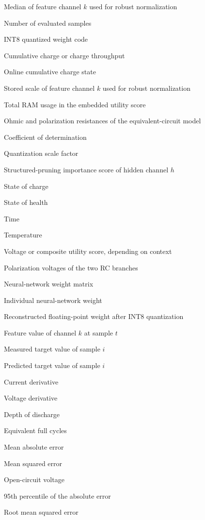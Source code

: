 \documentclass[
    a4paper,
    12pt,
    titlepage,
    bibliography=totoc,
    twoside=on,
    parskip=false,
    numbers=noenddot,
    cleardoublepage=empty,
    DIV=12,
    BCOR=12.0mm,
    headheight=36pt,
    headings=openright
]{scrreprt}
\begin{document}
\begin{description}[style=nextline,leftmargin=3.2cm]
\item[$m_k$] Median of feature channel $k$ used for robust normalization
\item[$n$] Number of evaluated samples
\item[$q$] INT8 quantized weight code
\item[$Q$] Cumulative charge or charge throughput
\item[$Q_c$] Online cumulative charge state
\item[$s_k$] Stored scale of feature channel $k$ used for robust normalization
\item[$R$] Total RAM usage in the embedded utility score
\item[$R_0,R_1,R_2$] Ohmic and polarization resistances of the equivalent-circuit model
\item[$R^2$] Coefficient of determination
\item[$s$] Quantization scale factor
\item[$s_h$] Structured-pruning importance score of hidden channel $h$
\item[$SOC$] State of charge
\item[$SOH$] State of health
\item[$t$] Time
\item[$T$] Temperature
\item[$U$] Voltage or composite utility score, depending on context
\item[$U_1,U_2$] Polarization voltages of the two RC branches
\item[$W$] Neural-network weight matrix
\item[$w$] Individual neural-network weight
\item[$\hat{w}$] Reconstructed floating-point weight after INT8 quantization
\item[$x_{t,k}$] Feature value of channel $k$ at sample $t$
\item[$y_i$] Measured target value of sample $i$
\item[$\hat{y}_i$] Predicted target value of sample $i$
\item[$\mathrm{d}I/\mathrm{d}t$] Current derivative
\item[$\mathrm{d}U/\mathrm{d}t$] Voltage derivative
\item[$\mathrm{DoD}$] Depth of discharge
\item[$\mathrm{EFC}$] Equivalent full cycles
\item[$\mathrm{MAE}$] Mean absolute error
\item[$\mathrm{MSE}$] Mean squared error
\item[$\mathrm{OCV}$] Open-circuit voltage
\item[$\mathrm{P95}$] 95th percentile of the absolute error
\item[$\mathrm{RMSE}$] Root mean squared error
\end{description}
\end{document}

